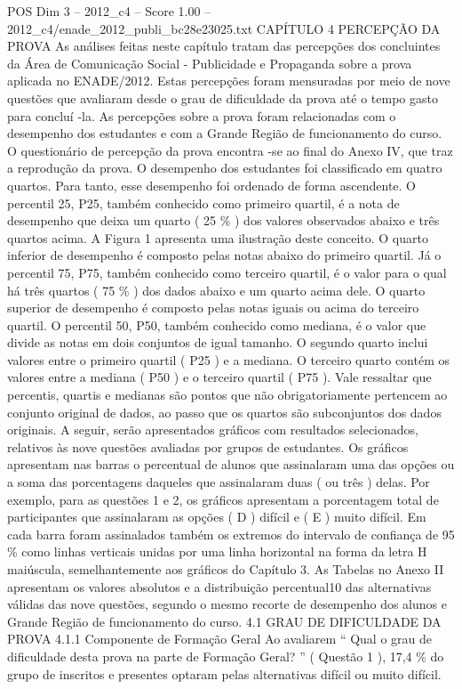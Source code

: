 \begin{textsample}{POS Dim 3 – 2012\_c4 – Score 1.00 – 2012\_c4/enade\_2012\_publi\_bc28e23025.txt}  \label{ex:f3_pos_153}
CAPÍTULO 4 PERCEPÇÃO DA PROVA As análises feitas neste capítulo tratam das percepções dos concluintes da Área de Comunicação Social - Publicidade e Propaganda sobre a prova aplicada no ENADE/2012.
Estas percepções foram mensuradas por meio de nove questões que avaliaram desde o grau de dificuldade da prova até o tempo gasto para concluí -la.
As percepções sobre a prova foram relacionadas com o desempenho dos estudantes e com a Grande Região de funcionamento do curso.
O questionário de percepção da prova encontra -se ao final do Anexo IV, que traz a reprodução da prova.
O desempenho dos estudantes foi classificado em quatro quartos.
Para tanto, esse desempenho foi ordenado de forma ascendente.
O percentil 25, P25, também conhecido como primeiro quartil, é a nota de desempenho que deixa um quarto ( 25 \% ) dos valores observados abaixo e três quartos acima.
A Figura 1 apresenta uma ilustração deste conceito.
O quarto inferior de desempenho é composto pelas notas abaixo do primeiro quartil.
Já o percentil 75, P75, também conhecido como terceiro quartil, é o valor para o qual há três quartos ( 75 \% ) dos dados abaixo e um quarto acima dele.
O quarto superior de desempenho é composto pelas notas iguais ou acima do terceiro quartil.
O percentil 50, P50, também conhecido como mediana, é o valor que divide as notas em dois conjuntos de igual tamanho.
O segundo quarto inclui valores entre o primeiro quartil ( P25 ) e a mediana.
O terceiro quarto contém os valores entre a mediana ( P50 ) e o terceiro quartil ( P75 ).
Vale ressaltar que percentis, quartis e medianas são pontos que não obrigatoriamente pertencem ao conjunto original de dados, ao passo que os quartos são subconjuntos dos dados originais.
A seguir, serão apresentados gráficos com resultados selecionados, relativos às nove questões avaliadas por grupos de estudantes.
Os gráficos apresentam nas barras o percentual de alunos que assinalaram uma das opções ou a soma das porcentagens daqueles que assinalaram duas ( ou três ) delas.
Por exemplo, para as questões 1 e 2, os gráficos apresentam a porcentagem total de participantes que assinalaram as opções ( D ) difícil e ( E ) muito difícil.
Em cada barra foram assinalados também os extremos do intervalo de confiança de 95 \% como linhas verticais unidas por uma linha horizontal na forma da letra H maiúscula, semelhantemente aos gráficos do Capítulo 3.
As Tabelas no Anexo II apresentam os valores absolutos e a distribuição percentual10 das alternativas válidas das nove questões, segundo o mesmo recorte de desempenho dos alunos e Grande Região de funcionamento do curso. 4.1 GRAU DE DIFICULDADE DA PROVA 4.1.1 Componente de Formação Geral Ao avaliarem “ Qual o grau de dificuldade desta prova na parte de Formação Geral? ” ( Questão 1 ), 17,4 \% do grupo de inscritos e presentes optaram pelas alternativas difícil ou muito difícil.

\end{textsample}
